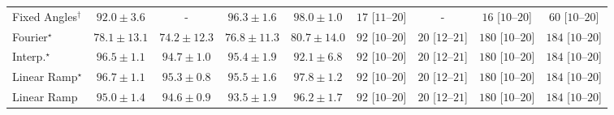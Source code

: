 \begin{tabular}{l|cccc|cccc|}
Fixed Angles$^\dagger$ & {\cellcolor[HTML]{056EAD}} \color[HTML]{F1F1F1} $92.0\pm 3.6$ & {\cellcolor[HTML]{000000}} \color[HTML]{F1F1F1} {\cellcolor{white}} \color{black} - & {\cellcolor[HTML]{034F7D}} \color[HTML]{F1F1F1} $96.3\pm 1.6$ & {\cellcolor[HTML]{023E62}} \color[HTML]{F1F1F1} $98.0\pm 1.0$ & {\cellcolor[HTML]{FEE7E4}} \color[HTML]{000000} $17$ [$11$--$20$] & {\cellcolor[HTML]{000000}} \color[HTML]{F1F1F1} {\cellcolor{white}} \color{black} - & {\cellcolor[HTML]{FEE9E5}} \color[HTML]{000000} $16$ [$10$--$20$] & {\cellcolor[HTML]{FBAFBA}} \color[HTML]{000000} $60$ [$10$--$20$] \\
Fourier$^\star$ & {\cellcolor[HTML]{CDD0E5}} \color[HTML]{000000} $78.1\pm 13.1$ & {\cellcolor[HTML]{EDE7F2}} \color[HTML]{000000} $74.2\pm 12.3$ & {\cellcolor[HTML]{D8D7E9}} \color[HTML]{000000} $76.8\pm 11.3$ & {\cellcolor[HTML]{ADC1DD}} \color[HTML]{000000} $80.7\pm 14.0$ & {\cellcolor[HTML]{F769A1}} \color[HTML]{F1F1F1} $92$ [$10$--$20$] & {\cellcolor[HTML]{FDE4E1}} \color[HTML]{000000} $20$ [$12$--$21$] & {\cellcolor[HTML]{51006C}} \color[HTML]{F1F1F1} $180$ [$10$--$20$] & {\cellcolor[HTML]{49006A}} \color[HTML]{F1F1F1} $184$ [$10$--$20$] \\
Interp.$^\star$ & {\cellcolor[HTML]{034D79}} \color[HTML]{F1F1F1} $96.5\pm 1.1$ & {\cellcolor[HTML]{045D92}} \color[HTML]{F1F1F1} $94.7\pm 1.0$ & {\cellcolor[HTML]{04588A}} \color[HTML]{F1F1F1} $95.4\pm 1.9$ & {\cellcolor[HTML]{056DAC}} \color[HTML]{F1F1F1} $92.1\pm 6.8$ & {\cellcolor[HTML]{F769A1}} \color[HTML]{F1F1F1} $92$ [$10$--$20$] & {\cellcolor[HTML]{FDE4E1}} \color[HTML]{000000} $20$ [$12$--$21$] & {\cellcolor[HTML]{51006C}} \color[HTML]{F1F1F1} $180$ [$10$--$20$] & {\cellcolor[HTML]{49006A}} \color[HTML]{F1F1F1} $184$ [$10$--$20$] \\
Linear Ramp$^\star$ & {\cellcolor[HTML]{034B76}} \color[HTML]{F1F1F1} $96.7\pm 1.1$ & {\cellcolor[HTML]{04598C}} \color[HTML]{F1F1F1} $95.3\pm 0.8$ & {\cellcolor[HTML]{045788}} \color[HTML]{F1F1F1} $95.5\pm 1.6$ & {\cellcolor[HTML]{034165}} \color[HTML]{F1F1F1} $97.8\pm 1.2$ & {\cellcolor[HTML]{F769A1}} \color[HTML]{F1F1F1} $92$ [$10$--$20$] & {\cellcolor[HTML]{FDE4E1}} \color[HTML]{000000} $20$ [$12$--$21$] & {\cellcolor[HTML]{51006C}} \color[HTML]{F1F1F1} $180$ [$10$--$20$] & {\cellcolor[HTML]{49006A}} \color[HTML]{F1F1F1} $184$ [$10$--$20$] \\
Linear Ramp & {\cellcolor[HTML]{045B8E}} \color[HTML]{F1F1F1} $95.0\pm 1.4$ & {\cellcolor[HTML]{045E93}} \color[HTML]{F1F1F1} $94.6\pm 0.9$ & {\cellcolor[HTML]{04649E}} \color[HTML]{F1F1F1} $93.5\pm 1.9$ & {\cellcolor[HTML]{034F7D}} \color[HTML]{F1F1F1} $96.2\pm 1.7$ & {\cellcolor[HTML]{F769A1}} \color[HTML]{F1F1F1} $92$ [$10$--$20$] & {\cellcolor[HTML]{FDE4E1}} \color[HTML]{000000} $20$ [$12$--$21$] & {\cellcolor[HTML]{51006C}} \color[HTML]{F1F1F1} $180$ [$10$--$20$] & {\cellcolor[HTML]{49006A}} \color[HTML]{F1F1F1} $184$ [$10$--$20$] \\

\end{tabular}
